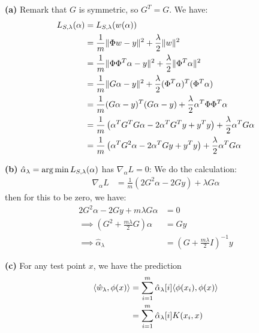 \documentclass[a4paper, 12pt]{article}
\begin{document}
\begin{problem} [Problem 3]
    \textbf{(a)} Remark that $G$ is symmetric, so $G^T = G$. We have:
    \begin{align*}
        L_{S, \lambda}(\alpha) &= L_{S, \lambda}(w(\alpha)) \\
        &= \frac{1}{m} \lVert\Phi w - y\rVert^2 + \frac{\lambda}{2} \lVert w\rVert^2 \\
        &= \frac{1}{m} \lVert\Phi \Phi^T \alpha - y\rVert^2 + \frac{\lambda}{2} \lVert\Phi^T \alpha\rVert^2 \\
        &= \frac{1}{m} \lVert G \alpha - y\rVert^2 + \frac{\lambda}{2} (\Phi^T \alpha)^T (\Phi^T \alpha) \\
        &= \frac{1}{m} (G\alpha - y)^T (G\alpha - y) + \frac{\lambda}{2} \alpha^T \Phi \Phi^T \alpha \\
        &= \frac{1}{m} \left(\alpha^T G^T G \alpha - 2\alpha^T G^Ty + y^T y \right) + \frac{\lambda}{2} \alpha^T G \alpha \\
        &= \frac{1}{m} \left(\alpha^T G^2 \alpha - 2\alpha^T Gy + y^T y \right) + \frac{\lambda}{2} \alpha^T G \alpha
        \end{align*}
        
    \textbf{(b)} $\hat{\alpha}_{\lambda} = \operatorname*{arg\,min} L_{S, \lambda}(\alpha)$ has $\nabla_{\alpha}  L = 0$:
    We do the calculation:
    \begin{align*}
        \nabla_\alpha L &= \frac{1}{m} (2G^2 \alpha - 2Gy) + \lambda G \alpha
    \end{align*}
    then for this to be zero, we have:
    \begin{align*}
        2G^2 \alpha - 2Gy + m \lambda G \alpha &= 0 \\
        \implies (G^2 + \frac{m\lambda}{2} G)\alpha &= Gy\\
        \implies \hat{\alpha}_\lambda &= (G + \frac{m\lambda}{2} I)^{-1}y
    \end{align*}

    \textbf{(c)} For any test point $x$, we have the prediction
    \begin{align*}
    \langle \hat{w}_{\lambda}, \phi(x) \rangle &= \sum_{i=1}^{m} \hat{\alpha}_{\lambda}[i] \langle \phi(x_i),  \phi(x) \rangle \\
    &= \sum_{i=1}^{m} \hat{\alpha}_{\lambda}[i] K(x_i, x)
    \end{align*}
\end{problem}
\end{document}
